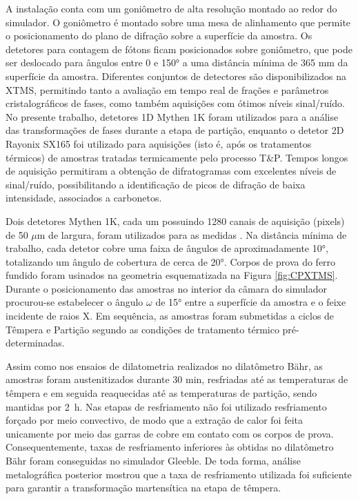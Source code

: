 A instalação conta com um goniômetro de alta resolução montado ao redor do simulador. O goniômetro é montado sobre uma mesa de alinhamento que permite o posicionamento do plano de difração sobre a superfície da amostra. Os detetores para contagem de fótons ficam posicionados sobre goniômetro, que pode ser deslocado para ângulos entre 0 e 150° a uma distância mínima de 365 mm da superfície da amostra. Diferentes conjuntos de detectores são disponibilizados na XTMS, permitindo tanto a avaliação em tempo real de frações e parâmetros cristalográficos de fases, como também aquisições com ótimos níveis sinal/ruído. No presente trabalho, detetores 1D Mythen 1K foram utilizados para a análise  das transformações de fases durante a etapa de partição, enquanto o detetor 2D Rayonix SX165 foi utilizado para aquisições  (isto é, após os tratamentos térmicos) de amostras tratadas termicamente pelo processo T\&P. Tempos longos de aquisição permitiram a obtenção de difratogramas com excelentes níveis de sinal/ruído, possibilitando a identificação de picos de difração de baixa intensidade, associados a carbonetos.

Dois detetores Mythen 1K, cada um possuindo 1280 canais de aquisição (pixels) de 50 $\mu$m de largura, foram utilizados para as medidas . Na distância mínima de trabalho, cada detetor cobre uma faixa de ângulos de aproximadamente 10°, totalizando um ângulo de cobertura de cerca de 20°. Corpos de prova do ferro fundido foram usinados na geometria esquematizada na Figura \ref{fig:CPXTMS}. Durante o posicionamento das amostras no interior da câmara do simulador procurou-se estabelecer o ângulo $\omega$ de 15° entre a superfície da amostra e o feixe incidente de raios X. Em sequência, as amostras foram submetidas a ciclos de Têmpera e Partição segundo as condições de tratamento térmico pré-determinadas.

Assim como nos ensaios de dilatometria realizados no dilatômetro Bähr, as amostras foram austenitizados durante 30 min, resfriadas até as temperaturas de têmpera e em seguida reaquecidas até as temperaturas de partição, sendo mantidas por 2~h. Nas etapas de resfriamento não foi utilizado resfriamento forçado por meio convectivo, de modo que a extração de calor foi feita unicamente por meio das garras de cobre em contato com os corpos de prova. Consequentemente, taxas de resfriamento inferiores às obtidas no dilatômetro Bähr foram conseguidas no simulador Gleeble. De toda forma, análise metalográfica posterior mostrou que a taxa de resfriamento utilizada foi suficiente para garantir a transformação martensítica na etapa de têmpera.

